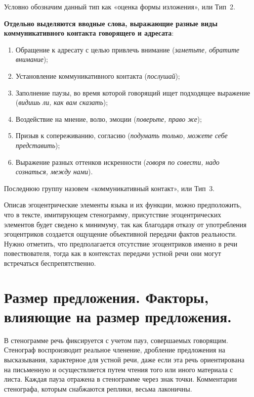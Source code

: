 \documentclass{kursa4}
\begin{document}
{      Условно обозначим данный тип как «оценка формы изложения», или Тип~2. 

      \textbf{Отдельно выделяются вводные слова, выражающие разные виды
      коммуникативного контакта говорящего и адресата}:
      \begin{enumerate}
        \item Обращение к адресату с целью привлечь внимание (\textit{заметьте,
        обратите внимание});
        \item Установление коммуникативного контакта (\textit{послушай});
        \item Заполнение паузы, во время которой говорящий ищет подходящее
        выражение (\textit{видишь ли, как вам сказать});
        \item Воздействие на мнение, волю, эмоции (\textit{поверьте, право же});
        \item Призыв к сопереживанию, согласию (\textit{подумать только, можете
        себе представить});
        \item Выражение разных оттенков искренности (\textit{говоря по совести,
        надо сознаться, между нами}).
      \end{enumerate}
      Последнюю группу назовем «коммуникативный контакт», или Тип~3.

      Описав эгоцентрические элементы языка и их функции, можно
      предположить, что в тексте, имитирующем стенограмму, присутствие
      эгоцентрических элементов будет сведено к минимуму, так как благодаря
      отказу от употребления эгоцентриков создается ощущение объективной
      передачи фактов реальности. Нужно отметить, что предполагается
      отсутствие эгоцентриков именно в речи повествователя, тогда как в
      контекстах передачи устной речи они могут встречаться беспрепятственно.

    \section{Размер предложения. Факторы, влияющие на размер предложения.}

      В стенограмме речь фиксируется с учетом пауз, совершаемых говорящим.
      Стенограф воспроизводит реальное членение, дробление предложения на
      высказывания, характерное для устной речи, даже если эта речь
      ориентирована на письменную и осуществляется путем чтения того или
      иного материала с листа. Каждая пауза отражена в стенограмме через знак
      точки. Комментарии стенографа, которым снабжаются реплики, весьма
      лаконичны.

}
\end{document}
